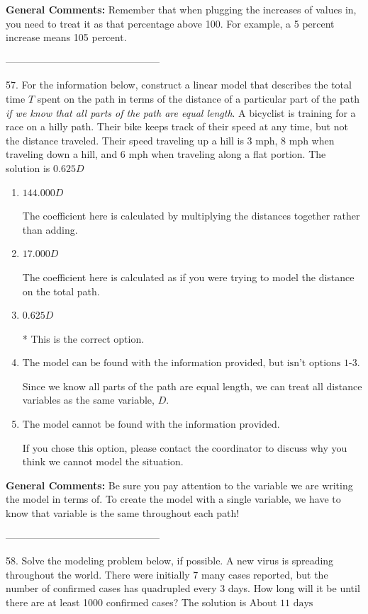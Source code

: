 \documentclass{extbook}[14pt]
\begin{document}
\textbf{General Comments:} Remember that when plugging the increases of values in, you need to treat it as that percentage above 100. For example, a 5 percent increase means 105 percent.

-----------------------------------------------

57. For the information below, construct a linear model that describes the total time $T$ spent on the path in terms of the distance of a particular part of the path \textit{if we know that all parts of the path are equal length}.
A bicyclist is training for a race on a hilly path. Their bike keeps track of their speed at any time, but not the distance traveled. Their speed traveling up a hill is 3 mph, 8 mph when traveling down a hill, and 6 mph when traveling along a flat portion. 
The solution is $ 0.625 D $ 

\begin{enumerate}[label=\Alph*.] 
\item $ 144.000 D $ 

 The coefficient here is calculated by multiplying the distances together rather than adding. 
\item $ 17.000 D $ 

 The coefficient here is calculated as if you were trying to model the distance on the total path. 
\item $ 0.625 D $ 

 * This is the correct option. 
\item $ \text{The model can be found with the information provided, but isn't options 1-3.} $ 

 Since we know all parts of the path are equal length, we can treat all distance variables as the same variable, $D$. 
\item $ \text{The model cannot be found with the information provided.} $ 

 If you chose this option, please contact the coordinator to discuss why you think we cannot model the situation. 
\end{enumerate} 
 
\textbf{General Comments:} Be sure you pay attention to the variable we are writing the model in terms of. To create the model with a single variable, we have to know that variable is the same throughout each path!

-----------------------------------------------

58. Solve the modeling problem below, if possible.
A new virus is spreading throughout the world. There were initially 7 many cases reported, but the number of confirmed cases has quadrupled every 3 days. How long will it be until there are at least 1000 confirmed cases? 
The solution is $ \text{About } 11 \text{ days} $ 
\end{document}
